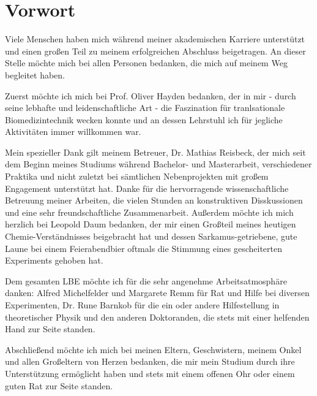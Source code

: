 \chapter*{Vorwort}
\thispagestyle{empty}
Viele Menschen haben mich während meiner akademischen Karriere unterstützt und einen großen Teil zu meinem erfolgreichen Abschluss beigetragen.  An dieser Stelle möchte mich bei allen Personen bedanken, die mich auf meinem Weg begleitet haben.

Zuerst möchte ich mich bei Prof. Oliver Hayden bedanken, der in mir - durch seine lebhafte und leidenschaftliche Art - die Faszination für tranlsationale Biomedizintechnik wecken konnte und an dessen Lehrstuhl ich für jegliche Aktivitäten immer willkommen war.

Mein spezieller Dank gilt meinem Betreuer, Dr. Mathias Reisbeck, der mich seit dem Beginn meines Studiums während Bachelor- und Masterarbeit, verschiedener Praktika und nicht zuletzt bei sämtlichen Nebenprojekten mit großem Engagement unterstützt hat. Danke für die hervorragende wissenschaftliche Betreuung meiner Arbeiten, die vielen Stunden an konstruktiven Disskussionen und eine sehr freundschaftliche Zusammenarbeit. Außerdem möchte ich mich herzlich bei Leopold Daum bedanken, der mir einen Großteil meines heutigen Chemie-Verständnisses beigebracht hat und dessen Sarkamus-getriebene, gute Laune bei einem Feierabendbier oftmals die Stimmung eines gescheiterten Experiments gehoben hat.

Dem gesamten LBE möchte ich für die sehr angenehme Arbeitsatmosphäre danken: Alfred Michelfelder und Margarete Remm für Rat und Hilfe bei diversen Experimenten, Dr. Rune Barnkob für die ein oder andere Hilfestellung in theoretischer Physik und den anderen Doktoranden, die stets mit einer helfenden Hand zur Seite standen.

Abschließend möchte ich mich bei meinen Eltern, Geschwistern, meinem Onkel und allen Großeltern von Herzen bedanken, die mir mein Studium durch ihre Unterstützung ermöglicht haben und stets mit einem offenen Ohr oder einem guten Rat zur Seite standen.